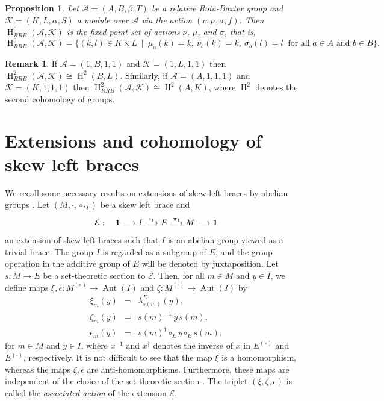 \documentclass[11pt]{amsart}
\theoremstyle{thrm}
\theoremstyle{plain}
\newtheorem{prop}[thm]{Proposition}
\theoremstyle{definition}
\newtheorem{remark}[equation]{Remark}
\newcommand{\Ho}{\operatorname{H} }
\newcommand{\Aut}{\operatorname{Aut} }
\numberwithin{equation}{section}
\begin{document}
\begin{prop}
 Let $\mathcal{A}=(A, B, \beta, T)$ be a  relative Rota-Baxter group and $\mathcal{K}=(K, L, \alpha, S)$ a module over  $\mathcal{A}$ via the action $(\nu, \mu, \sigma, f)$. Then  $\Ho^0_{RRB}(\mathcal{A}, \mathcal{K})$ is the fixed-point set of actions $\nu$, $\mu$, and $\sigma$, that is,
$$\Ho^0_{RRB}(\mathcal{A}, \mathcal{K})=\big\{(k,l) \in K \times L ~\mid~ \mu_a(k)=k,~ \nu_b(k)=k, ~\sigma_b(l)=l  ~\mbox{ for all } a \in A \mbox{ and }b \in B \big\}.$$
\end{prop}


\begin{remark}
If $\mathcal{A}= (1,B, 1, 1)$  and $\mathcal{K}=  (1,L,1, 1)$ then $\Ho^2_{RRB}(\mathcal{A}, \mathcal{K}) \cong \Ho^2(B,L)$. Similarly, if  $\mathcal{A}= (A,1, 1, 1)$ and $\mathcal{K}=  (K,1,1, 1)$ then $\Ho^2_{RRB}(\mathcal{A}, \mathcal{K}) \cong \Ho^2(A,K)$, where $\Ho^2$ denotes the second cohomology of groups. 
\end{remark}


\section{Extensions and cohomology of skew left braces}\label{sec extensions skew braces}

We recall some necessary results on extensions of skew left braces by abelian groups \cite{NMY1}.  Let  $(M, \cdot, \circ_M)$ be a skew left brace and 
$$\mathcal{E}: \quad {\bf 1} \longrightarrow I \stackrel{i_1}{\longrightarrow}  E \stackrel{\pi_1}{\longrightarrow} M \longrightarrow {\bf 1}$$ an extension of skew left braces such that $I$ is an abelian group viewed as a trivial brace.  The group $I$ is regarded as a subgroup of $E$, and the group operation in the additive group of $E$ will be denoted by juxtaposition.  Let $s : M \rightarrow E$ be a set-theoretic section to $\mathcal{E}$. Then, for all $ m \in M$ and $y \in I$, we  define  maps $\xi, 	\epsilon : M^{(\circ)} \rightarrow \Aut(I)$ and $\zeta :M^{(\cdot)} \rightarrow \Aut(I)$  by
\begin{eqnarray}
	\xi_m(y) & = &  \lambda^E_{s(m)}(y),\label{action1 sb}\\
	\zeta_m(y) & = & s(m)^{-1}  \,y \, s(m),\label{action2 sb}\\
	\epsilon_m(y) & = & s(m)^{\dagger} \circ_E y \circ_E s(m),\label{action3 sb}
\end{eqnarray}
for $m \in M$ and $y \in I$, where $x^{-1}$ and $x^\dagger$ denotes the inverse of $x$ in $E^{(\circ)}$ and $E^{(\cdot)}$, respectively. It is not difficult to see  that the map $\xi$ is  a homomorphism, whereas the maps $\zeta, \epsilon $ are  anti-homomorphisms. Furthermore, these maps are independent of the choice of the set-theoretic section \cite[Proposition 3.4]{NMY1}. The triplet $(\xi, \zeta, \epsilon)$ is called the \emph{associated action} of the extension $\mathcal{E}$. 
\par 
\end{document}
